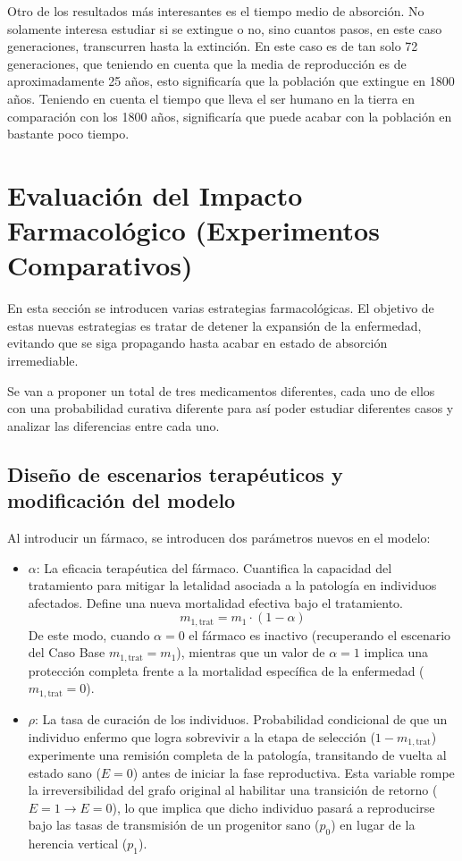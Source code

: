 \documentclass[graybox]{SNmult}
\begin{document}
	Otro de los resultados más interesantes es el tiempo medio de absorción. No solamente interesa estudiar si se extingue o no, sino cuantos pasos, en este caso generaciones, transcurren hasta la extinción. En este caso es de tan solo 72 generaciones, que teniendo en cuenta que la media de reproducción es de aproximadamente 25 años, esto significaría que la población que extingue en 1800 años. Teniendo en cuenta el tiempo que lleva el ser humano en la tierra en comparación con los 1800 años, significaría que puede acabar con la población en bastante poco tiempo. 
	
	\section{Evaluación del Impacto Farmacológico (Experimentos Comparativos)}
	\label{sec:farmacos}
	En esta sección se introducen varias estrategias farmacológicas. El objetivo de estas nuevas estrategias es tratar de detener la expansión de la enfermedad, evitando que se siga propagando hasta acabar en estado de absorción irremediable. 
	
	Se van a proponer un total de tres medicamentos diferentes, cada uno de ellos con una probabilidad curativa diferente para así poder estudiar diferentes casos y analizar las diferencias entre cada uno. 
	
	\subsection{Diseño de escenarios terapéuticos y modificación del modelo}
	Al introducir un fármaco, se introducen dos parámetros nuevos en el modelo: 
	\begin{itemize}
		\item $\alpha$: La eficacia terapéutica del fármaco. Cuantifica la capacidad del tratamiento para mitigar la letalidad asociada a la patología en individuos afectados. Define una nueva mortalidad efectiva bajo el tratamiento. 
		\begin{equation}
			m_{1,\text{trat}} = m_1 \cdot (1 - \alpha)
		\end{equation}
		De este modo, cuando $\alpha = 0$ el fármaco es inactivo (recuperando el escenario del Caso Base $m_{1,\text{trat}} = m_1$), mientras que un valor de $\alpha = 1$ implica una protección completa frente a la mortalidad específica de la enfermedad ($m_{1,\text{trat}} = 0$).
		\item $\rho$: La tasa de curación de los individuos. Probabilidad condicional de que un individuo enfermo que logra sobrevivir a la etapa de selección ($1 - m_{1,\text{trat}}$) experimente una remisión completa de la patología, transitando de vuelta al estado sano ($E=0$) antes de iniciar la fase reproductiva. Esta variable rompe la irreversibilidad del grafo original al habilitar una transición de retorno ($E=1 \rightarrow E=0$), lo que implica que dicho individuo pasará a reproducirse bajo las tasas de transmisión de un progenitor sano ($p_0$) en lugar de la herencia vertical ($p_1$).
	\end{itemize}
		
\end{document}
